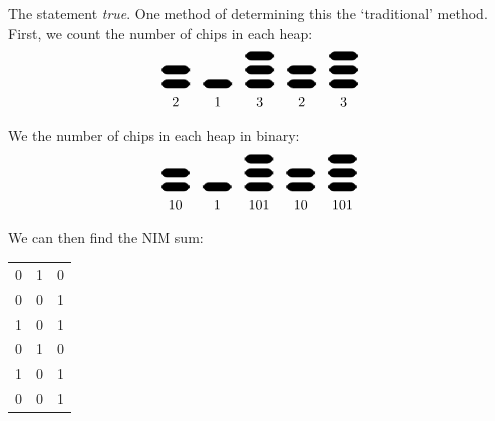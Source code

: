 \documentclass[11pt,letterpaper]{article}
\begin{document}
\sol The statement \textit{true}. One method of determining this the `traditional' method. First, we count the number of chips in each heap:
	\[
	\begin{tikzpicture}[scale=0.7]
	\draw[rounded corners,fill=black] (0,0) rectangle (1,0.3);
	\draw[rounded corners,fill=black] (0,0.5) rectangle (1,0.8);
	\node at (0.5,-0.5) {$2$};
	\draw[rounded corners,fill=black] (1.5,0) rectangle (2.5,0.3);
	\node at (2,-0.5) {$1$};
	\draw[rounded corners,fill=black] (3,0) rectangle (4,0.3);
	\draw[rounded corners,fill=black] (3,0.5) rectangle (4,0.8);
	\draw[rounded corners,fill=black] (3,1) rectangle (4,1.3);	
	\node at (3.5,-0.5) {$3$};
	\draw[rounded corners,fill=black] (4.5,0) rectangle (5.5,0.3);
	\draw[rounded corners,fill=black] (4.5,0.5) rectangle (5.5,0.8);	
	\node at (5,-0.5) {$2$};
	\draw[rounded corners,fill=black] (6,0) rectangle (7,0.3);
	\draw[rounded corners,fill=black] (6,0.5) rectangle (7,0.8);
	\draw[rounded corners,fill=black] (6,1) rectangle (7,1.3);	
	\node at (6.5,-0.5) {$3$};
	\end{tikzpicture}
	\]
We the number of chips in each heap in binary:
	\[
	\begin{tikzpicture}[scale=0.7]
	\draw[rounded corners,fill=black] (0,0) rectangle (1,0.3);
	\draw[rounded corners,fill=black] (0,0.5) rectangle (1,0.8);
	\node at (0.5,-0.5) {$10$};
	\draw[rounded corners,fill=black] (1.5,0) rectangle (2.5,0.3);
	\node at (2,-0.5) {$1$};
	\draw[rounded corners,fill=black] (3,0) rectangle (4,0.3);
	\draw[rounded corners,fill=black] (3,0.5) rectangle (4,0.8);
	\draw[rounded corners,fill=black] (3,1) rectangle (4,1.3);	
	\node at (3.5,-0.5) {$101$};
	\draw[rounded corners,fill=black] (4.5,0) rectangle (5.5,0.3);
	\draw[rounded corners,fill=black] (4.5,0.5) rectangle (5.5,0.8);	
	\node at (5,-0.5) {$10$};
	\draw[rounded corners,fill=black] (6,0) rectangle (7,0.3);
	\draw[rounded corners,fill=black] (6,0.5) rectangle (7,0.8);
	\draw[rounded corners,fill=black] (6,1) rectangle (7,1.3);	
	\node at (6.5,-0.5) {$101$};
	\end{tikzpicture}
	\]
We can then find the NIM sum:
	\begin{table}[h]
	\centering
	\begin{tabular}{rrr}
	0 & 1 & 0 \\
	0 & 0 & 1 \\
	1 & 0 & 1 \\
	0 & 1 & 0 \\
	1 & 0 & 1 \\ \hline
	0 & 0 & 1
	\end{tabular}
	\end{table}
\end{document}
